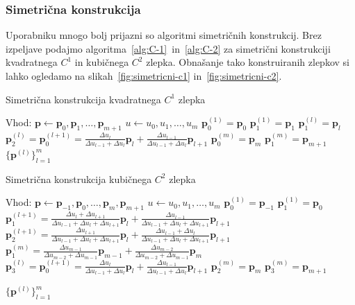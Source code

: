 \documentclass[isrm2, tisk]{fmfdelo}
\newcommand{\p}{\mathbf{p}}
\begin{document}
    \subsubsection{Simetrična konstrukcija}
    Uporabniku mnogo bolj prijazni so algoritmi simetričnih konstrukcij.
    Brez izpeljave podajmo algoritma~\ref{alg:C-1}~in~\ref{alg:C-2} za simetrični konstrukciji kvadratnega $C^1$ in kubičnega $C^2$ zlepka.
    Obnašanje tako konstruiranih zlepkov si lahko ogledamo na slikah~\ref{fig:simetricni-c1} in~\ref{fig:simetricni-c2}.
    \begin{algorithm}[H]
        \caption{Simetrična konstrukcija kvadratnega $C^1$ zlepka}
        \label{alg:C-1}
        \begin{algorithmic}
            \State Vhod:
            \State $\p \gets \p_0,\p_1,\dots,\p_{m+1}$
            \State $u \gets u_0,u_1,\dots,u_m$
            \State
            \State $\p_0^{(1)} = \p_0$
            \State $\p_1^{(1)} = \p_1$
                \State $\p_1^{(l)}=\p_{l}$
                \State $\p_2^{(l)} = \p_0^{(l+1)} = \frac{\Delta u_l}{\Delta u_{l-1} + \Delta u_{l}}\p_l+\frac{\Delta u_{l-1}}{\Delta u_{l-1} + \Delta u_{l}}\p_{l+1}$
            \EndFor
            \State $\p_0^{(m)} = \p_m$
            \State $\p_1^{(m)} = \p_{m+1}$
            \State
            \State \Return $\{\mathbf{p}^{(l)}\}^{m}_{l=1}$
        \end{algorithmic}
    \end{algorithm}
    \begin{algorithm}[H]
        \caption{Simetrična konstrukcija kubičnega $C^2$ zlepka}
        \label{alg:C-2}
        \begin{algorithmic}
            \State Vhod:
            \State $\p \gets \p_{-1},\p_0,\dots,\p_{m},\p_{m+1}$
            \State $u \gets u_0,u_1,\dots,u_m$
            \State
            \State $\p_0^{(1)} = \p_{-1}$
            \State $\p_1^{(1)} = \p_0$
                \State $\p_1^{(l+1)} = \frac{\Delta u_l + \Delta u_{l+1}}{\Delta u_{l-1} + \Delta u_{l}+ \Delta u_{l+1}}\p_l+\frac{\Delta u_{l-1}}{\Delta u_{l-1} + \Delta u_{l}+ \Delta u_{l+1}}\p_{l+1}$
                \State $\p_2^{(l+1)} = \frac{ \Delta u_{l+1}}{\Delta u_{l-1} + \Delta u_{l}+ \Delta u_{l+1}}\p_l+\frac{\Delta u_{l-1}+\Delta u_l }{\Delta u_{l-1} + \Delta u_{l}+ \Delta u_{l+1}}\p_{l+1}$
            \EndFor
            \State $\p_1^{(m)}= \frac{\Delta u_{m-1}}{\Delta u_{m-2} + \Delta u_{m-1}}\p_{m-1}+\frac{\Delta u_{m-2}}{\Delta u_{m-2} + \Delta u_{m-1}}\p_{m}$
                \State $\p_3^{(l)} = \p_0^{(l+1)} = \frac{\Delta u_l}{\Delta u_{l-1} + \Delta u_{l}}\p_l+\frac{\Delta u_{l-1}}{\Delta u_{l-1} + \Delta u_{l}}\p_{l+1}$
            \EndFor
            \State $\p_2^{(m)} = \p_m$
            \State $\p_3^{(m)} = \p_{m+1}$

            \State
            \State \Return $\{\mathbf{p}^{(l)}\}^{m}_{l=1}$
        \end{algorithmic}
    \end{algorithm}
\end{document}
